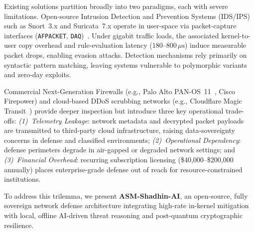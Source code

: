 \documentclass[journal]{IEEEtran}
\renewcommand{\_}{\textunderscore\allowbreak}
\begin{document}
Existing solutions partition broadly into two paradigms, each with severe
limitations. Open-source Intrusion Detection and Prevention Systems (IDS/IPS)
such as Snort~3.x and Suricata~7.x operate in user-space via packet-capture
interfaces (\texttt{AF\_PACKET}, \texttt{DAQ})~\cite{roesch1999snort}. Under
gigabit traffic loads, the associated kernel-to-user copy overhead and
rule-evaluation latency ($180$--$800\,\mu\text{s}$) induce measurable packet
drops, enabling evasion attacks. Detection mechanisms rely primarily on
syntactic pattern matching, leaving systems vulnerable to polymorphic variants
and zero-day exploits.

Commercial Next-Generation Firewalls (e.g., Palo Alto
PAN-OS~11~\cite{paloalto2024panos}, Cisco Firepower) and cloud-based DDoS
scrubbing networks (e.g., Cloudflare Magic
Transit~\cite{cloudflare2024magic}) provide deeper inspection but introduce
three key operational trade-offs: \emph{(1)~Telemetry Leakage}: network
metadata and decrypted packet payloads are transmitted to third-party cloud
infrastructure, raising data-sovereignty concerns in defense and classified
environments; \emph{(2)~Operational Dependency}: defense perimeters degrade
in air-gapped or degraded network settings; and \emph{(3)~Financial
Overhead}: recurring subscription licensing
(\$40{,}000--\$200{,}000 annually) places enterprise-grade defense out of
reach for resource-constrained institutions.

To address this trilemma, we present \textbf{ASM-Shadhin-AI}, an open-source,
fully sovereign network defense architecture integrating high-rate in-kernel
mitigation with local, offline AI-driven threat reasoning and post-quantum
cryptographic resilience.
\end{document}

